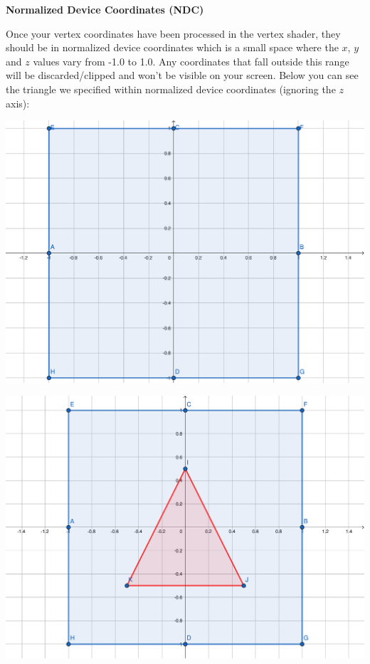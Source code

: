 \begin{note}
    \begin{center}
        \textbf{Normalized Device Coordinates (NDC)}
    \end{center}
    Once your vertex coordinates have been processed in the vertex shader, they should be in normalized device coordinates which is a small space where the $x$, $y$ and $z$ values vary from -1.0 to 1.0. Any coordinates that fall outside this range will be discarded/clipped and won't be visible on your screen. Below you can see the triangle we specified within normalized device coordinates (ignoring the $z$ axis):

    \begin{center}
        \includegraphics[scale=0.4]{pics/bounds.pdf}
    \end{center}

    \begin{center}
        \includegraphics[scale=0.4]{pics/triangle_ndc.pdf}
    \end{center}


\end{note}
